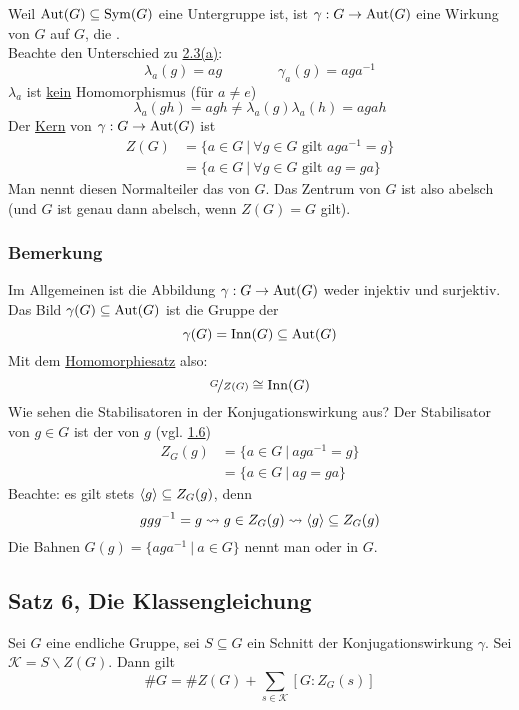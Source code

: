 Weil $\operatorname{Aut}(G)\subseteq \operatorname{Sym}(G)$ eine Untergruppe ist, ist $\gamma:G\to \operatorname{Aut}(G)$ eine Wirkung von $G$ auf $G$, die .\\
Beachte den Unterschied zu \hyperref[sub:bsp_wirkungen]{2.3(a)}:
\[
\lambda_a(g)=ag\qquad\qquad \gamma_a(g)=aga^{-1}
\]
$\lambda_a$ ist \uline{kein} Homomorphismus (für $a\not=e $) 
\[\lambda_a(gh)=agh\not= \lambda_a(g)\lambda_a(h)=agah 
\]
Der \uline{Kern} von $\gamma:G\to\operatorname{Aut}(G)$ ist
\begin{equation*}
\begin{aligned}
	Z(G) &= \{a\in G~|~\forall g\in G\text{ gilt }aga^{-1}=g\}\\
	&= \{a\in G~|~\forall g\in G\text{ gilt }ag=ga \}
\end{aligned}
\end{equation*}
Man nennt diesen Normalteiler das  von $G$. 
Das Zentrum von $G$ ist also abelsch (und $G$ ist genau dann abelsch, wenn $Z(G)=G$ gilt).


\subsubsection*{Bemerkung}
Im Allgemeinen ist die Abbildung $\gamma:G\to\operatorname{Aut}(G)$ weder injektiv und surjektiv. 
Das Bild $\gamma(G)\subseteq\operatorname{Aut}(G)$ ist die Gruppe der  
\[
\gamma(G)=\operatorname{Inn}(G)\subseteq \operatorname{Aut}(G)
\]
Mit dem \hyperref[sub:der_homomorphiesatz]{Homomorphiesatz} also: 
\[
\nicefrac{G}{Z(G)}\cong\operatorname{Inn}(G)
\]
Wie sehen die Stabilisatoren in der Konjugationswirkung aus? 
Der Stabilisator von $g\in G$ ist der  von $g$ (vgl. \hyperref[sub:def_zentralisieren]{1.6})
\begin{equation*}
\begin{aligned}
	Z_G(g) &= \{a\in G~|~aga^{-1}=g \}\\
	&= \{a\in G~|~ag=ga \}
\end{aligned}
\end{equation*}
Beachte: 
es gilt stets $\langle g \rangle\subseteq Z_G(g)$, denn 
\[
ggg^{-1}=g \rightsquigarrow g\in Z_G(g) \rightsquigarrow \langle g \rangle\subseteq Z_G(g) 
\]
Die Bahnen $G(g)=\{aga^{-1}~|~a\in G\}$ nennt man  oder  in $G$.


\subsection{Satz 6, Die Klassengleichung}
\label{sub:klassengleichung}
Sei $G$ eine endliche Gruppe, sei $S\subseteq G$ ein Schnitt der Konjugationswirkung $\gamma$.
Sei $\mathcal{K}=S\backslash Z(G)$. 
Dann gilt 
\[
\#G=\#Z(G)+\sum_{s\in \mathcal{K}}[G:Z_G(s)] 
\]

